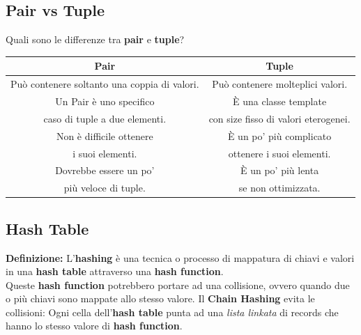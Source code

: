 \subsection{Pair vs Tuple}

\textsf{\small Quali sono le differenze tra \textbf{pair} e \textbf{tuple}?} \\

\begin{tabular}{|c|c|}
	\hline
	\textbf{Pair} & \textbf{Tuple} \\
	\hline
	\textsf{\small Può contenere soltanto una coppia di valori.} & \textsf{\small Può contenere molteplici valori.} \\
	\hline
	\textsf{\small Un Pair è uno specifico } & \textsf{\small È una classe template } \\
	\textsf{\small caso di tuple a due elementi.} & \textsf{\small con size fisso di valori eterogenei.} \\
	\hline
	\textsf{\small Non è difficile ottenere } & \textsf{\small È un po' più complicato } \\
	\textsf{\small i suoi elementi.} & \textsf{\small ottenere i suoi elementi.} \\
	\hline
	\textsf{\small Dovrebbe essere un po' } & \textsf{\small È un po' più lenta } \\
	\textsf{\small più veloce di tuple.} & \textsf{\small se non ottimizzata.} \\ %
	\hline
\end{tabular}

\newpage

\subsection{Hash Table}

\textsf{\small \textbf{Definizione: } L'\textbf{hashing} è una tecnica o processo di mappatura di chiavi e valori in una \textbf{hash table} attraverso una \textbf{hash function}.} \\

\textsf{\small Queste \textbf{hash function} potrebbero portare ad una collisione, ovvero quando due o più chiavi sono mappate allo stesso valore. Il \textbf{Chain Hashing} evita le collisioni: Ogni cella dell'\textbf{hash table} punta ad una \emph{lista linkata} di records che hanno lo stesso valore di \textbf{hash function}.} \\

